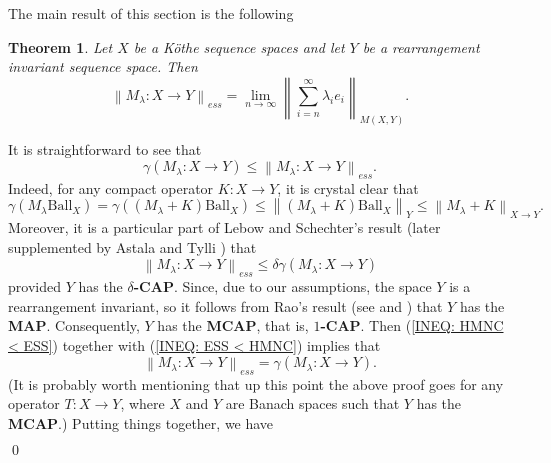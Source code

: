 \documentclass[11pt]{amsart}
\theoremstyle{definition}
\newtheorem{theorem}{Theorem}[section]
\theoremstyle{definition}
\theoremstyle{definition}
\theoremstyle{definition}
\theoremstyle{definition}
\theoremstyle{definition}
\theoremstyle{definition}
\theoremstyle{definition}
\numberwithin{equation}{section}
\numberwithin{equation}{section}
\numberwithin{equation}{section}
\theoremstyle{definition}
\theoremstyle{definition}
\theoremstyle{definition}
\theoremstyle{definition}
\theoremstyle{definition}
\theoremstyle{definition}
\newcommand{\norm}[1]{\left\lVert#1\right\rVert}
\renewenvironment{proof}{\noindent {\bf Proof.}}{\qed}
\begin{document}
The main result of this section is the following

\begin{theorem}\label{thm: ess norm ri}
	{\it Let $X$ be a K{\" o}the sequence spaces and let $Y$ be a rearrangement invariant sequence space. Then}
	\begin{equation*}
		\norm{M_{\lambda} \colon X \rightarrow Y}_{ess} = \lim\limits_{n \rightarrow \infty} \norm{ \sum_{i = n}^{\infty} \lambda_i e_i }_{M(X,Y)}.
	\end{equation*}
\end{theorem}
\begin{proof}
	It is straightforward to see that
	\begin{equation} \label{INEQ: HMNC < ESS}
		\gamma(M_{\lambda} \colon X \rightarrow Y) \leqslant \norm{M_{\lambda} \colon X \rightarrow Y}_{ess}.
	\end{equation}
	Indeed, for any compact operator $K \colon X \rightarrow Y$, it is crystal clear that
	\begin{equation*}
		\gamma(M_{\lambda}\text{Ball}_X) = \gamma\left( (M_{\lambda}+K)\text{Ball}_X \right) \leqslant \norm{(M_{\lambda}+K)\text{Ball}_X}_Y \leqslant \norm{M_{\lambda}+K}_{X \rightarrow Y}.
	\end{equation*}
	Moreover, it is a particular part of Lebow and Schechter's result \cite[Theorem~3.6]{LS71}
	(later supplemented by Astala and Tylli \cite[Theorems~2.2 and 2.3]{AT87}) that
	\begin{equation} \label{INEQ: ESS < HMNC}
		\norm{M_{\lambda} \colon X \rightarrow Y}_{ess} \leqslant \delta \gamma(M_{\lambda} \colon X \rightarrow Y)
	\end{equation}
	provided $Y$ has the {\bf $\delta$-CAP}.
	Since, due to our assumptions, the space $Y$ is a rearrangement invariant, so it follows from Rao's result (see \cite[Theorem~4.6]{Rao70} and \cite{Rao73})
	that $Y$ has the {\bf MAP}.
	Consequently, $Y$ has the {\bf MCAP}, that is, {\bf $1$-CAP}.
	Then (\ref{INEQ: HMNC < ESS}) together with (\ref{INEQ: ESS < HMNC}) implies that
	\begin{equation} \label{EQ: ESS = HMNC}
		\norm{M_{\lambda} \colon X \rightarrow Y}_{ess} = \gamma(M_{\lambda} \colon X \rightarrow Y).
	\end{equation}
	(It is probably worth mentioning that up this point the above proof goes for any operator $T \colon X \rightarrow Y$,
	where $X$ and $Y$ are Banach spaces such that $Y$ has the {\bf MCAP}.) Putting things together, we have
	\begin{align*}

\end{align*}
\end{proof}
\end{document}
